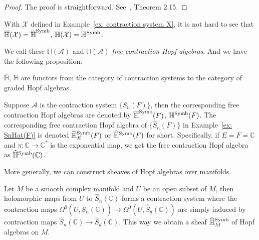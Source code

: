 \begin{proof}
The proof is straightforward. See~\cite{ZDHZ_HopfAlgebrasOfMultiplePolylogarithmsAndHolomorphicOneForms}, Theorem 2.15.
\end{proof}

\begin{example}
With $\mathcal X$ defined in Example~\ref{ex: contraction system X}, it is not hard to see that $\overline{\mathbb H}(\mathcal X)=\overline{\mathbb H}^{\operatorname{Symb}}$, $\mathbb H(\mathcal X)=\mathbb H^{\operatorname{Symb}}$.
\end{example}

We call these $\overline{\mathbb H}(\mathcal A)$ and $\mathbb H(\mathcal A)$ \textit{free contraction Hopf algebras}. And we have the following proposition.

\begin{proposition}
$\overline{\mathbb H}$, $\mathbb H$ are functors from the category of contraction systems to the category of graded Hopf algebras.
\end{proposition}


\begin{example}
Suppose $\mathcal A$ is the contraction system $\{S_n(F)\}$, then the corresponding free contraction Hopf algebras are denoted by $\overline{\mathbb H}^{\operatorname{Symb}}(F)$, $\mathbb H^{\operatorname{Symb}}(F)$. The corresponding free contraction Hopf algebra of $\{\widehat S_n(F)\}$ in Example~\ref{ex: SnHat(F)} is denoted $\widehat{\mathbb H}^{\operatorname{Symb}}_E(F)$ or $\widehat{\mathbb H}^{\operatorname{Symb}}(F)$ for short. Specifically, if $E=F=\mathbb C$ and $\pi:\mathbb C\to\mathbb C^*$ is the exponential map, we get the free contraction Hopf algebra as $\widehat{\mathbb H}^{\operatorname{Symb}}(\mathbb C)$.
\end{example}

More generally, we can construct sheaves of Hopf algebras over manifolds.

\begin{example}
Let $M$ be a smooth complex manifold and $U$ be an open subset of $M$, then holomorphic maps from $U$ to $\widehat S_n(\mathbb C)$ forms a contraction system where the contraction maps $\Omega^0(U,\widehat S_n(\mathbb C))\to\Omega^0(U,\widehat S_d(\mathbb C))$ are simply induced by contraction maps $\widehat S_n(\mathbb C)\to\widehat S_d(\mathbb C)$. This way we obtain a sheaf $\widehat{\mathbb H}^{\operatorname{Symb}}_M$ of Hopf algebras on $M$.
\end{example}

